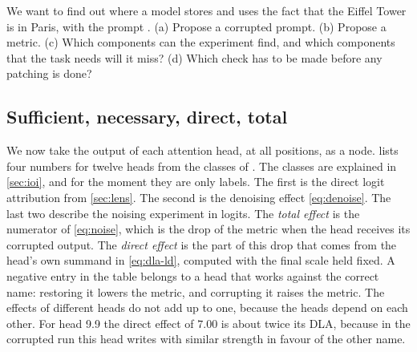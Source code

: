 \begin{exercise}\label{ex:design}
We want to find out where a model stores and uses the fact that the Eiffel Tower is in Paris, with the prompt
. (a) Propose a corrupted prompt. (b) Propose a metric.
(c) Which components can the experiment find, and which components that the task needs will it miss? (d) Which
check has to be made before any patching is done?
\end{exercise}

\subsection{Sufficient, necessary, direct, total}
\label{sec:necessity}

We now take the output of each attention head, at all positions, as a node.  lists four numbers
for twelve heads from the classes of \citet{wang2023interpretability}. The classes are explained in
\cref{sec:ioi}, and for the moment they are only labels. The first is the direct logit attribution from \cref{sec:lens}. The second
is the denoising effect \eqref{eq:denoise}. The last two describe the noising experiment in logits. The
\emph{total effect} is the numerator of \eqref{eq:noise}, which is the drop of the metric when the head receives
its corrupted output. The \emph{direct effect} is the part of this drop that comes from the head's own summand
in \eqref{eq:dla-ld}, computed with the final scale held fixed. A negative entry in the table belongs to a head
that works against the correct name: restoring it lowers the metric, and corrupting it raises the metric. The
effects of different heads do not add up to one, because the heads depend on each other. For head 9.9 the direct
effect of $7.00$ is about twice its DLA, because in the corrupted run this head writes with similar strength in
favour of the other name.

